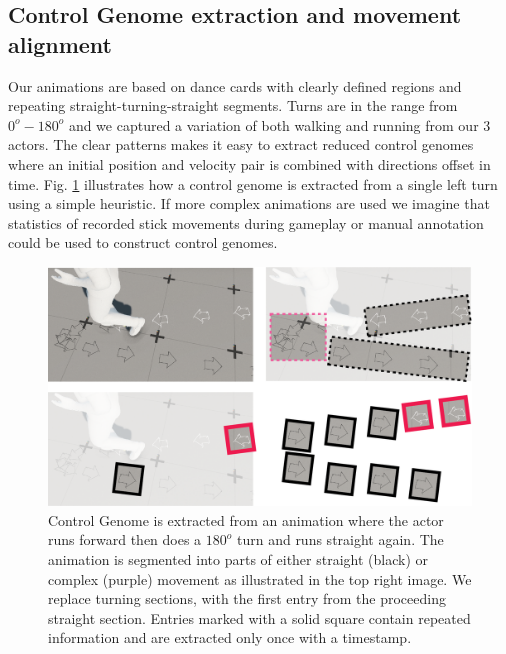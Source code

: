 \subsection{Control Genome extraction and movement alignment}
Our animations are based on dance cards with clearly defined regions and repeating straight-turning-straight segments. Turns are in the range from $0^o-180^o$ and we captured a variation of both walking and running from our 3 actors. The clear patterns makes it easy to extract reduced control genomes where an initial position and velocity pair is combined with directions offset in time. Fig. \ref{fig:results:genome_extraction} illustrates how a control genome is extracted from a single left turn using a simple heuristic. If more complex animations are used we imagine that statistics of recorded stick movements during gameplay or manual annotation could be used to construct control genomes. 
\begin{figure}
    \centering
    \includegraphics[width=1.0\columnwidth]{img/genome_extract.png}
    \caption{Control Genome is extracted from an animation where the actor runs forward then does a $180^o$ turn and runs straight again. The animation is segmented into parts of either straight (black) or complex (purple) movement as illustrated in the top right image. We replace turning sections, with the first entry from the proceeding straight section. Entries marked with a solid square contain repeated information and are extracted only once with a timestamp.}
    \label{fig:results:genome_extraction}
\end{figure}

